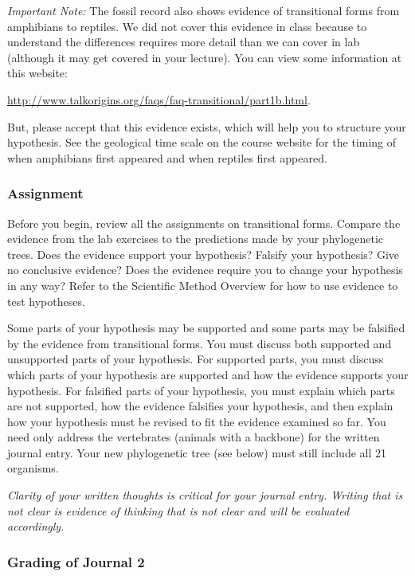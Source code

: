 \documentclass[12pt]{exam}
\begin{document}
\emph{Important Note:} The fossil record also shows evidence of
transitional forms from amphibians to reptiles. We did not cover this
evidence in class because to understand the differences requires more
detail than we can cover in lab (although it may get covered in your lecture).
You can view some information at this website:

\url{http://www.talkorigins.org/faqs/faq-transitional/part1b.html}. 

But, please accept that this evidence exists, which will help you to
structure your hypothesis. See the geological time scale on the course
website for the timing of when amphibians first appeared and when
reptiles first appeared.

\subsubsection*{Assignment}

Before you begin, review all the assignments on transitional forms.  
Compare the evidence from the lab exercises to the predictions 
made by your phylogenetic trees. Does the evidence support your
hypothesis? Falsify your hypothesis? Give no conclusive evidence? 
Does the evidence require you to change your hypothesis in any way? 
Refer to the Scientific Method Overview for how to use evidence to test 
hypotheses.

Some parts of your hypothesis may be supported and
some parts may be falsified by the evidence from transitional forms.
You must discuss both supported and unsupported parts of your
hypothesis. For supported parts, you must discuss which parts of your
hypothesis are supported and how the evidence supports your hypothesis.
For falsified parts of your hypothesis, you must explain which parts are
not supported, how the evidence falsifies your hypothesis, and then
explain how your hypothesis must be revised to fit the evidence examined
so far. You need only address the vertebrates (animals with a
backbone) for the written journal entry. Your new phylogenetic tree (see
below) must still include all 21 organisms.

\emph{Clarity of your written thoughts is critical for your journal entry. Writing that is not clear is evidence of
 thinking that is not clear and will be evaluated accordingly.}


\subsubsection*{Grading of Journal 2}
\end{document}

